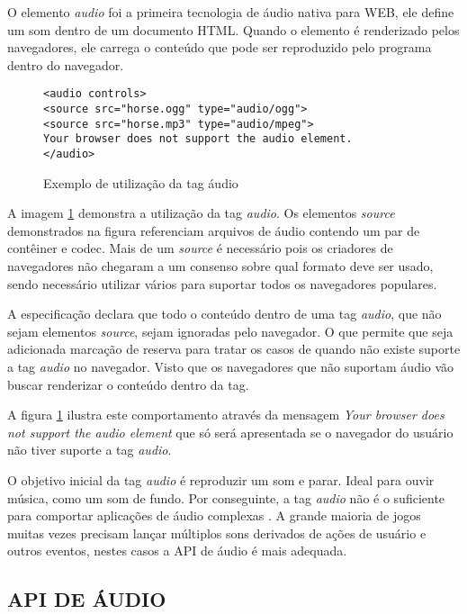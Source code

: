 O elemento \textit{audio} foi a primeira tecnologia de áudio nativa
para WEB, ele define um som dentro de um documento HTML. Quando o
elemento é renderizado pelos navegadores, ele carrega o conteúdo que
pode ser reproduzido pelo programa dentro do navegador.

\begin{figure}[H]
\centering
\begin{verbatim}
<audio controls>
<source src="horse.ogg" type="audio/ogg">
<source src="horse.mp3" type="audio/mpeg">
Your browser does not support the audio element.
</audio>
\end{verbatim}
\caption{Exemplo de utilização da tag áudio}
\label{fig:htmlAudio}
\end{figure}

A imagem \ref{fig:htmlAudio} demonstra a utilização da tag
\textit{audio}. Os elementos \textit{source} demonstrados na figura
referenciam arquivos de áudio contendo um par de contêiner e
codec. Mais de um \textit{source } é necessário pois os criadores
de navegadores não chegaram a um consenso sobre qual formato deve
ser usado, sendo necessário utilizar vários para suportar todos os
navegadores populares.

A especificação declara que todo o conteúdo dentro de uma tag
\textit{audio}, que não sejam elementos \textit{source}, sejam ignoradas
pelo navegador. O que permite que seja adicionada marcação de reserva
para tratar os casos de quando não existe suporte a tag \textit{audio}
no navegador. Visto que os navegadores que não suportam áudio vão buscar
renderizar o conteúdo dentro da tag.

A figura \ref{fig:htmlAudio} ilustra este comportamento através da
mensagem \textit{Your browser does not support the audio element } que
só será apresentada se o navegador do usuário não tiver suporte a
tag \textit{audio}.

O objetivo inicial da tag \textit{audio} é reproduzir um som e parar.
Ideal para ouvir música, como um som de fundo. Por conseguinte, a tag
\textit{audio} não é o suficiente para comportar aplicações de
áudio complexas \autocite{audioApiSpec}. A grande maioria de jogos
muitas vezes precisam lançar múltiplos sons derivados de ações
de usuário e outros eventos, nestes casos a API de áudio é mais
adequada.

\subsection{API DE ÁUDIO}

